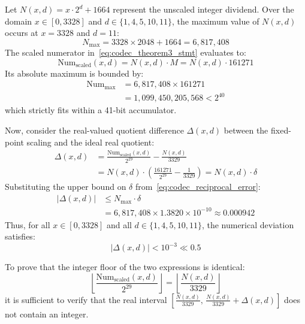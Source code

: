 \vspace{3pt}
\begin{IEEEproof}
Let $N(x, d) = x \cdot 2^d + 1664$ represent the unscaled integer dividend. Over the domain $x \in [0, 3328]$ and $d \in \{1, 4, 5, 10, 11\}$, the maximum value of $N(x, d)$ occurs at $x = 3328$ and $d = 11$:
\begin{equation}
N_{\max} = 3328 \times 2048 + 1664 = 6,817,408
\end{equation}
The scaled numerator in~\eqref{eq:codec_theorem3_stmt} evaluates to:
\begin{equation}
\text{Num}_{\text{scaled}}(x, d) = N(x, d) \cdot M = N(x, d) \cdot 161271
\end{equation}
Its absolute maximum is bounded by:
\begin{align}
\text{Num}_{\max} &= 6,817,408 \times 161271 \nonumber \\
&= 1,099,450,205,568 < 2^{40}
\end{align}
which strictly fits within a 41-bit accumulator.

Now, consider the real-valued quotient difference $\Delta(x, d)$ between the fixed-point scaling and the ideal real quotient:
\begin{align}
\Delta(x, d) &= \frac{\text{Num}_{\text{scaled}}(x, d)}{2^{29}} - \frac{N(x, d)}{3329} \nonumber \\
&= N(x, d) \cdot \left( \frac{161271}{2^{29}} - \frac{1}{3329} \right) = N(x, d) \cdot \delta
\end{align}
Substituting the upper bound on $\delta$ from~\eqref{eq:codec_reciprocal_error}:
\begin{align}
|\Delta(x, d)| &\le N_{\max} \cdot \delta \nonumber \\
&= 6,817,408 \times 1.3820 \times 10^{-10} \approx 0.000942
\end{align}
Thus, for all $x \in [0, 3328]$ and all $d \in \{1, 4, 5, 10, 11\}$, the numerical deviation satisfies:
\begin{equation}
|\Delta(x, d)| < 10^{-3} \ll 0.5
\end{equation}

To prove that the integer floor of the two expressions is identical:
\begin{equation}
\left\lfloor \frac{\text{Num}_{\text{scaled}}(x, d)}{2^{29}} \right\rfloor = \left\lfloor \frac{N(x, d)}{3329} \right\rfloor
\end{equation}
it is sufficient to verify that the real interval $\left[ \frac{N(x, d)}{3329}, \, \frac{N(x, d)}{3329} + \Delta(x, d) \right]$ does not contain an integer. 


\end{IEEEproof}
